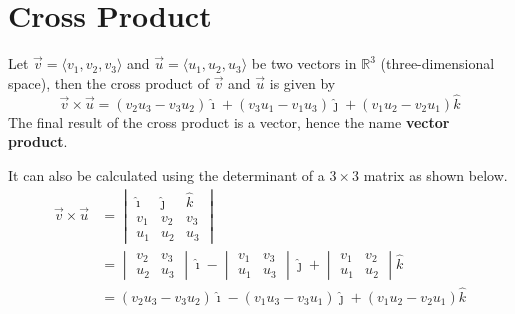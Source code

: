 \chapter{Cross Product}

Let $\vec{v} = \langle v_1, v_2, v_3 \rangle$ and $\vec{u} = \langle u_1, u_2,
    u_3 \rangle$ be two vectors in $\mathbb{R}^3$ (three-dimensional space), then
the cross product of $\vec{v}$ and $\vec{u}$ is given by \[\vec{v} \times \vec{u} = (v_2u_3 - v_3u_2)\hat{\imath} + (v_3u_1 - v_1u_3)\hat{\jmath} + (v_1u_2 - v_2u_1)\hat{k}\]
The final result of the cross product is a vector, hence the name
\textbf{vector product}.

It can also be calculated using the determinant of a $3 \times 3$ matrix as
shown below.
\begin{align*}
    \vec{v} \times \vec{u} & = \begin{vmatrix}
                                   \hat{\imath} & \hat{\jmath} & \hat{k} \\
                                   v_1          & v_2          & v_3     \\
                                   u_1          & u_2          & u_3
                               \end{vmatrix}                                 \\
                           & = \begin{vmatrix}
                                   v_2 & v_3 \\
                                   u_2 & u_3
                               \end{vmatrix}\hat{\imath} - \begin{vmatrix}
                                                               v_1 & v_3 \\
                                                               u_1 & u_3
                                                           \end{vmatrix}\hat{\jmath} + \begin{vmatrix}
                                                                                           v_1 & v_2 \\
                                                                                           u_1 & u_2
                                                                                       \end{vmatrix}\hat{k}             \\
                           & = (v_2u_3 - v_3u_2)\hat{\imath} - (v_1u_3 - v_3u_1)\hat{\jmath} + (v_1u_2 - v_2u_1)\hat{k}
\end{align*}

